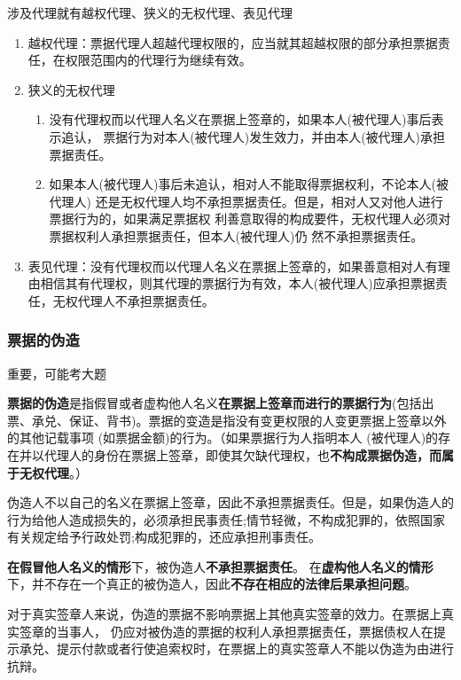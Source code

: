 \documentclass[UTF8,12pt]{ctexart}
\numberwithin{equation}{section} %
\numberwithin{figure}{section}
\numberwithin{table}{section}
\begin{document}
	涉及代理就有越权代理、狭义的无权代理、表见代理
	\begin{enumerate}
		\item 越权代理：票据代理人超越代理权限的，应当就其超越权限的部分承担票据责任，在权限范围内的代理行为继续有效。
		
		\item 狭义的无权代理
		\begin{enumerate}
			\item 没有代理权而以代理人名义在票据上签章的，如果本人(被代理人)事后表示追认， 票据行为对本人(被代理人)发生效力，并由本人(被代理人)承担票据责任。
			
			\item 如果本人(被代理人)事后未追认，相对人不能取得票据权利，不论本人(被代理人) 还是无权代理人均不承担票据责任。但是，相对人又对他人进行票据行为的，如果满足票据权 利善意取得的构成要件，无权代理人必须对票据权利人承担票据责任，但本人(被代理人)仍 然不承担票据责任。
		\end{enumerate}
		
		\item 表见代理：没有代理权而以代理人名义在票据上签章的，如果善意相对人有理由相信其有代理权，则其代理的票据行为有效，本人(被代理人)应承担票据责任，无权代理人不承担票据责任。
	\end{enumerate}
	
	\subsubsection{票据的伪造}
	重要，可能考大题
	
	\textbf{票据的伪造}是指假冒或者虚构他人名义\textbf{在票据上签章而进行的票据行为}(包括出票、承兑、保证、背书)。票据的变造是指没有变更权限的人变更票据上签章以外的其他记载事项 (如票据金额)的行为。（如果票据行为人指明本人 (被代理人)的存在并以代理人的身份在票据上签章，即使其欠缺代理权，也\textbf{不构成票据伪造，而属于无权代理}。）

	伪造人不以自己的名义在票据上签章，因此不承担票据责任。但是，如果伪造人的行为给他人造成损失的，必须承担民事责任;情节轻微，不构成犯罪的，依照国家有关规定给予行政处罚;构成犯罪的，还应承担刑事责任。
	
	\textbf{在假冒他人名义的情形}下，被伪造人\textbf{不承担票据责任}。 在\textbf{虚构他人名义的情形}下，并不存在一个真正的被伪造人，因此\textbf{不存在相应的法律后果承担问题}。
	
	对于真实签章人来说，伪造的票据不影响票据上其他真实签章的效力。在票据上真实签章的当事人， 仍应对被伪造的票据的权利人承担票据责任，票据债权人在提示承兑、提示付款或者行使追索权时，在票据上的真实签章人不能以伪造为由进行抗辩。
	
\end{document}
